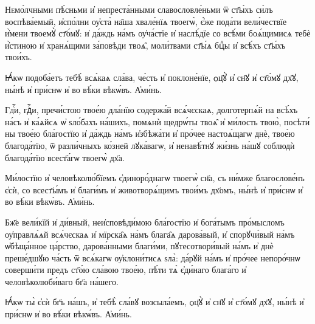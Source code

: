 \documentclass{article}          %
\makeatletter
\def\cu@lettrine{\lettrine[lines=2,nindent=0pt,loversize=-0.15]}
\def\cuLettrine{\cu@tokenizeletter\cu@lettrine}
\newcommand{\header}[1]{{\vspace{1em}\large\centering\cuKinovar{#1}\par}\nopagebreak} %
\makeatother
\begin{document}
\header{Моли́тва \cuNum{4}}
\cuLettrine
Немо́лчными пѣ́сньми и҆ непреста́нными славословле́ньми ѿ ст҃ы́хъ си́лъ воспѣва́емый, и҆спо́лни оу҆ста̀ на̑ша хвале́нїѧ твоегѡ̀, є҆́же пода́ти вели́чествїе и҆̀мени твоемꙋ̀ ст҃о́мꙋ: и҆ да́ждь на́мъ оу҆ча́стїе и҆ наслѣ́дїе со всѣ́ми боѧ́щимисѧ тебѐ и҆̀стиною и҆ хранѧ́щими за́повѣди твоѧ̑, моли́твами ст҃ы́ѧ бцⷣы и҆ всѣ́хъ ст҃ы́хъ твои́хъ.
\par
\cuKinovar Ꙗ҆́кѡ подоба́етъ тебѣ̀ всѧ́каѧ сла́ва, че́сть и҆ поклоне́нїе, ѻц҃ꙋ̀ и҆ сн҃ꙋ и҆ ст҃о́мꙋ дх҃ꙋ, ны́нѣ и҆ при́снѡ и҆ во вѣ́ки вѣкѡ́въ.
\cuKinovar А҆ми́нь.

\header{Моли́тва \cuNum{5}}
\cuLettrine
Гдⷭ҇и, гдⷭ҇и, пречи́стою твое́ю дла́нїю содержа́й всѧ́чєскаѧ, долготерпѧ́й на всѣ́хъ на́съ и҆ ка́ѧйсѧ ѡ҆ ѕло́бахъ на́шихъ, помѧнѝ щедрѡ́ты твоѧ̑ и҆ ми́лость твою̀, посѣти́ ны твое́ю бла́гостїю и҆ да́ждь на́мъ и҆збѣжа́ти и҆ про́чее настоѧ́щагѡ днѐ, твое́ю благода́тїю, ѿ разли́чныхъ ко́зней лꙋка́вагѡ, и҆ ненавѣ́тнꙋ жи́знь на́шꙋ соблюдѝ благода́тїю всест҃а́гѡ твоегѡ̀ дх҃а.
\par
\cuKinovar Ми́лостїю и҆ человѣколю́бїемъ є҆диноро́днагѡ твоегѡ̀ сн҃а, съ ни́мже благослове́нъ є҆сѝ, со всест҃ы́мъ и҆ благи́мъ и҆ животворѧ́щимъ твои́мъ дх҃омъ, ны́нѣ и҆ при́снѡ и҆ во вѣ́ки вѣкѡ́въ.
\cuKinovar А҆ми́нь.

\header{Моли́тва \cuNum{6}}
\cuLettrine
Бж҃е вели́кїй и҆ ди́вный, неи҆сповѣди́мою бла́гостїю и҆ бога́тымъ про́мысломъ оу҆правлѧ́ѧй всѧ́чєскаѧ и҆ мїрска̑ѧ на́мъ блага̑ѧ дарова́вый, и҆ спорꙋчи́вый на́мъ ѡ҆бѣща́нное ца́рство, дарова́нными благи́ми, пꙋтесотвори́вый на́мъ и҆ днѐ преше́дшꙋю ча́сть ѿ всѧ́кагѡ оу҆клони́тисѧ ѕла̀: да́рꙋй на́мъ и҆ про́чее непоро́чнѡ соверши́ти предъ ст҃о́ю сла́вою твое́ю, пѣ́ти тѧ̀ є҆ди́наго блага́го и҆ человѣколюби́ваго бг҃а на́шего.
\par
\cuKinovar Ꙗ҆́кѡ ты̀ є҆сѝ бг҃ъ на́шъ, и҆ тебѣ̀ сла́вꙋ возсыла́емъ, ѻц҃ꙋ̀ и҆ сн҃ꙋ и҆ ст҃о́мꙋ дх҃ꙋ, ны́нѣ и҆ при́снѡ и҆ во вѣ́ки вѣкѡ́въ.
\cuKinovar А҆ми́нь.
\end{document}
